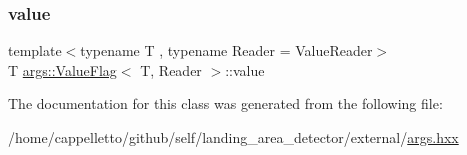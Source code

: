 \mbox{\label{classargs_1_1_value_flag_a330854b61d30e5c4023bfc24e22a7652}} 
\subsubsection{\texorpdfstring{value}{value}}
{\footnotesize\ttfamily template$<$typename T , typename Reader  = Value\+Reader$>$ \\
T \hyperlink{classargs_1_1_value_flag}{args\+::\+Value\+Flag}$<$ T, Reader $>$\+::value\hspace{0.3cm}{\ttfamily [protected]}}



The documentation for this class was generated from the following file\+:\begin{DoxyCompactItemize}
\item 
/home/cappelletto/github/self/landing\+\_\+area\+\_\+detector/external/\hyperlink{args_8hxx}{args.\+hxx}\end{DoxyCompactItemize}
